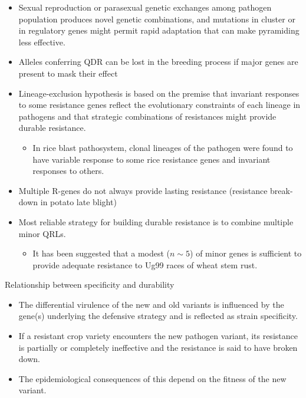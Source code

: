 \documentclass[11pt,dvipsnames,ignorenonframetext,aspectratio=169]{beamer}
\providecommand{\tightlist}{%
  \setlength{\itemsep}{0pt}\setlength{\parskip}{0pt}}
\begin{document}
\begin{frame}{}
\protect\hypertarget{section-2}{}
\small

\begin{itemize}
\tightlist
\item
  Sexual reproduction or parasexual genetic exchanges among pathogen
  population produces novel genetic combinations, and mutations in
  cluster or in regulatory genes might permit rapid adaptation that can
  make pyramiding less effective.
\item
  Alleles conferring QDR can be lost in the breeding process if major
  genes are present to mask their effect
\item
  \alert{Lineage-exclusion hypothesis} is based on the premise that
  invariant responses to some resistance genes reflect the evolutionary
  constraints of each lineage in pathogens and that strategic
  combinations of resistances might provide durable resistance.

  \begin{itemize}
  \tightlist
  \item
    In rice blast pathosystem, clonal lineages of the pathogen were
    found to have variable response to some rice resistance genes and
    invariant responses to others.
  \end{itemize}
\item
  Multiple R-genes do not always provide lasting resistance (resistance
  break-down in potato late blight)
\item
  Most reliable strategy for building durable resistance is to combine
  multiple minor QRLs.

  \begin{itemize}
  \tightlist
  \item
    It has been suggested that a modest (\(n \sim 5\)) of minor genes is
    sufficient to provide adequate resistance to Ug99 races of wheat
    stem rust.
  \end{itemize}
\end{itemize}
\end{frame}

\begin{frame}{Relationship between specificity and durability}
\protect\hypertarget{relationship-between-specificity-and-durability}{}
\begin{itemize}
\tightlist
\item
  The differential virulence of the new and old variants is influenced
  by the gene(s) underlying the defensive strategy and is reflected as
  strain specificity.
\item
  If a resistant crop variety encounters the new pathogen variant, its
  resistance is partially or completely ineffective and the resistance
  is said to have broken down.
\item
  The epidemiological consequences of this depend on the fitness of the
  new variant.
\end{itemize}
\end{frame}
\end{document}
